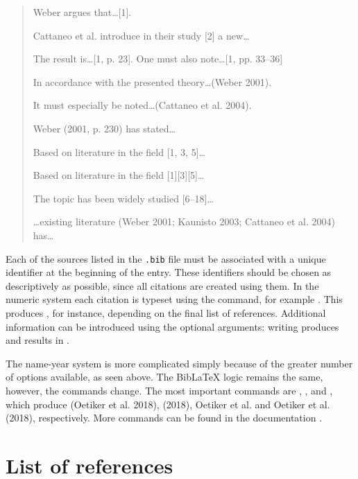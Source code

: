 \begin{quotation}
\noindent Weber argues that\ldots [1].

\noindent Cattaneo et al. introduce in their study [2] a new\ldots

\noindent The result is\ldots [1, p. 23]. One must also note\ldots [1, pp. 33--36]

\noindent In accordance with the presented theory\ldots (Weber 2001).

\noindent It must especially be noted\ldots (Cattaneo et al. 2004).

\noindent Weber (2001, p. 230) has stated\ldots

\noindent Based on literature in the field [1, 3, 5]\ldots

\noindent Based on literature in the field [1][3][5]\ldots

\noindent The topic has been widely studied [6--18]\ldots

\noindent\ldots existing literature (Weber 2001; Kaunisto 2003; Cattaneo et al. 2004) has\ldots
\end{quotation}

Each of the sources listed in the \texttt{.bib} file must be associated with a unique identifier at the beginning of the entry. These identifiers should be chosen as descriptively as possible, since all citations are created using them. In the numeric system each citation is typeset using the  command, for example . This produces \cite{notsoshort}, for instance, depending on the final list of references. Additional information can be introduced using the optional arguments: writing  produces \cite[p. 30]{notsoshort} and  results in \cite[see][p. 30]{notsoshort}.

The name-year system is more complicated simply because of the greater number of options available, as seen above. The Bib\LaTeX{} logic remains the same, however, the commands change. The most important commands are , ,  and , which produce (Oetiker et al. 2018), (2018), Oetiker et al. and Oetiker et al. (2018), respectively. More commands can be found in the documentation .

\section{List of references}

